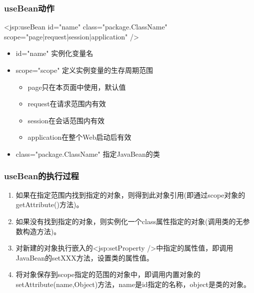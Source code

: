 \begin{frame} %
  \frametitle{useBean动作} 
  

  \begin{jspCode}
    <jsp:useBean id="name" class="package.ClassName" 
      scope="page|request|session|application" />
  \end{jspCode}

  \begin{itemize}
  \item id="name" 实例化变量名
  \item scope="scope" 定义实例变量的生存周期范围
    \begin{itemize}\kai\small
    \item page只在本页面中使用，默认值
    \item request在请求范围内有效
    \item session在会话范围内有效
    \item application在整个Web启动后有效
    \end{itemize}
  \item class="package.ClassName" 指定JavaBean的类
  \end{itemize}
\end{frame}

\begin{frame}[fragile] %
\frametitle{useBean的执行过程} 
\begin{enumerate}\kai
\item 如果在指定范围内找到指定的对象，则得到此对象引用(即通过scope对象的getAttribute()方法)。
\item 如果没有找到指定的对象，则实例化一个class属性指定的对象(调用类的无参数构造方法)。
\item 对新建的对象执行嵌入的<jsp:setProperty />中指定的属性值，即调用JavaBean的setXXX方法，设置类的属性值。
\item 将对象保存到scope指定的范围的对象中，即调用内置对象的setAttribute(name,Object)方法，name是id指定的名称，object是类的对象。
\end{enumerate}
\end{frame}

